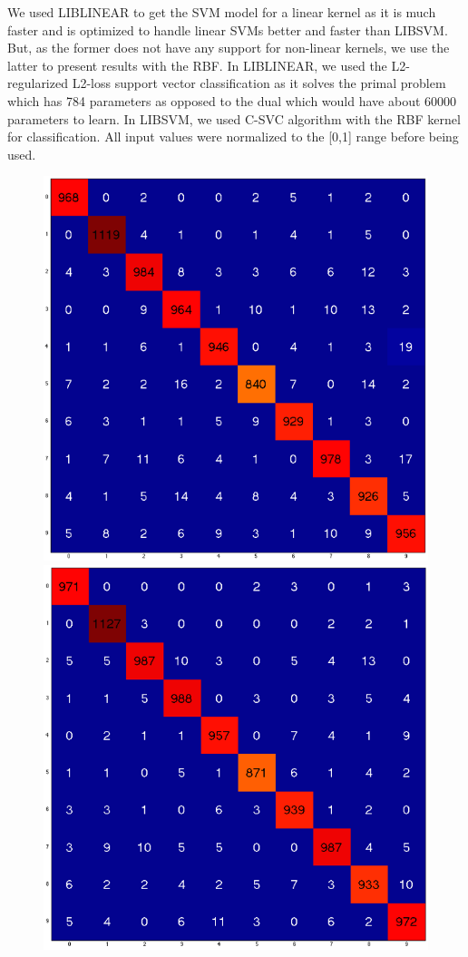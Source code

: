 \documentclass[10pt,twocolumn,letterpaper]{article}
\begin{document}
We used LIBLINEAR to get the SVM model for a linear kernel as it is much faster and is optimized to handle linear SVMs better and faster than LIBSVM. But, as the former does not have any support for non-linear kernels, we use the latter to present results with the RBF. In LIBLINEAR, we used the L2-regularized L2-loss support vector classification as it solves the primal problem which has 784 parameters as opposed to the dual which would have about 60000 parameters to learn. In LIBSVM, we used C-SVC algorithm with the RBF kernel for classification. All input values were normalized to the [0,1] range before being used.
\begin{figure}
\begin{center}
	\includegraphics[scale=0.25]{../images/confusion_1.png}
	\includegraphics[scale=0.25]{../images/confusion_2_2.png}

\end{center}
\end{figure}
\end{document}
